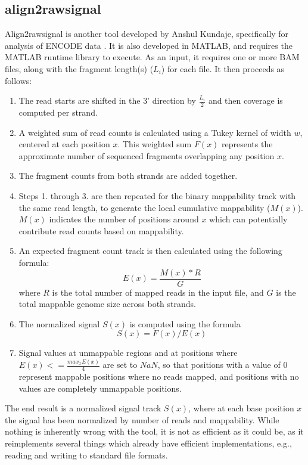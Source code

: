 \documentclass[a4paper]{article}
\begin{document}
    \subsection{align2rawsignal}
    Align2rawsignal is another tool developed by Anshul Kundaje, specifically for analysis of ENCODE data \cite{hoffman_integrative_2013}.
    It is also developed in MATLAB, and requires the MATLAB runtime library to execute. As an input, it requires one or more
    BAM files, along with the fragment length(s) ($L_i$) for each file. It then proceeds as follows:
    \begin{enumerate}
      \item The read starts are shifted in the 3' direction by $\frac{L_i}{2}$ and then coverage is computed per strand.
      \item A weighted sum of read counts is calculated using a Tukey kernel of width $w$, centered at each position $x$.
            This weighted sum $F(x)$ represents the approximate number of sequenced fragments overlapping any position $x$.
      \item The fragment counts from both strands are added together.
      \item Steps 1. through 3. are then repeated for the binary mappability track with the same read length, to generate the
            local cumulative mappability ($M(x)$). $M(x)$ indicates the number of positions around $x$ which can potentially
            contribute read counts based on mappability.
      \item An expected fragment count track is then calculated using the following formula:
      \begin{equation}
        \label{eq:1}
        E(x) = \frac{M(x)*R}{G}
      \end{equation}
      where $R$ is the total number of mapped reads in the input file, and $G$ is the total mappable genome size across both strands.
      \item The normalized signal $S(x)$ is computed using the formula
      \begin{equation}
        \label{eq:2}
        S(x) = F(x) / E(x)
      \end{equation}
      \item Signal values at unmappable regions and at positions where $E(x) <= \frac{max_xE(x)}{4}$ are set to $NaN$, so that
            positions with a value of 0 represent mappable positions where no reads mapped, and positions with no values
            are completely unmappable positions.
    \end{enumerate}
    The end result is a normalized signal track $S(x)$, where at each base position $x$ the signal has been normalized by
    number of reads and mappability. While nothing is inherently wrong with the tool, it is not as efficient as it could be,
    as it reimplements several things which already have efficient implementations, e.g., reading and writing to standard file formats.
\end{document}
